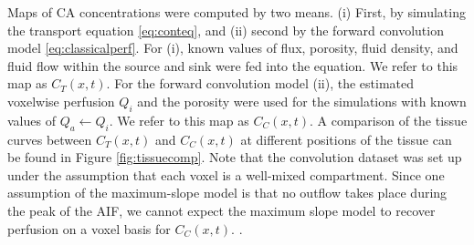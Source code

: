 \documentclass[paper=a4, fontsize=11pt,parskip=half,headings=small]{scrartcl}
\newcommand{\Perf}{Q}
\begin{document}
	Maps of CA concentrations were computed by two means. (i) First, by simulating the transport equation \eqref{eq:conteq}, and (ii) second by the forward convolution model \eqref{eq:classicalperf}. For (i), known values of flux, porosity, fluid density, and fluid flow within the source and sink were fed into the equation. We refer to this map as $C_T(x,t)$. For the forward convolution model (ii), the estimated voxelwise perfusion $\Perf_i$ and the porosity were used for the simulations with known values of $\Perf_a \leftarrow \Perf_i$. We refer to this map as $C_C(x,t)$. 
	A comparison of the tissue curves between $C_T(x,t)$ and $C_C(x,t)$ at different positions of the tissue can be found in Figure \ref{fig:tissuecomp}. 
	Note that the convolution dataset was set up under the assumption that each voxel is a well-mixed compartment.
	Since one assumption of the maximum-slope model is that no outflow takes place during the peak of the AIF, we cannot expect the maximum slope model to recover perfusion on a voxel basis for $C_C(x,t)$.
	.
\end{document}
